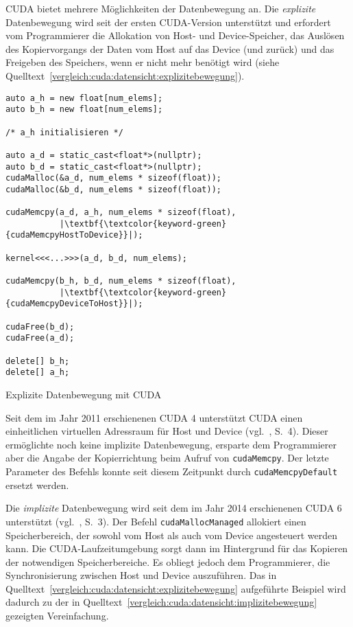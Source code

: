 CUDA bietet mehrere Möglichkeiten der Datenbewegung an. Die \textit{explizite}
Datenbewegung wird seit der ersten CUDA-Version unterstützt und erfordert vom
Programmierer die Allokation von Host- und Device-Speicher, das Auslösen des
Kopiervorgangs der Daten vom Host auf das Device (und zurück) und das Freigeben
des Speichers, wenn er nicht mehr benötigt wird (siehe
Quelltext~\ref{vergleich:cuda:datensicht:explizitebewegung}).

\begin{code}
    \begin{verbatim}
auto a_h = new float[num_elems];
auto b_h = new float[num_elems];

/* a_h initialisieren */

auto a_d = static_cast<float*>(nullptr);
auto b_d = static_cast<float*>(nullptr);
cudaMalloc(&a_d, num_elems * sizeof(float));
cudaMalloc(&b_d, num_elems * sizeof(float));

cudaMemcpy(a_d, a_h, num_elems * sizeof(float),
           |\textbf{\textcolor{keyword-green}{cudaMemcpyHostToDevice}}|);

kernel<<<...>>>(a_d, b_d, num_elems);

cudaMemcpy(b_h, b_d, num_elems * sizeof(float),
           |\textbf{\textcolor{keyword-green}{cudaMemcpyDeviceToHost}}|);

cudaFree(b_d);
cudaFree(a_d);

delete[] b_h;
delete[] a_h;
    \end{verbatim}
    \caption{Explizite Datenbewegung mit CUDA}
    \label{vergleich:cuda:datensicht:explizitebewegung}
\end{code}

Seit dem im Jahr 2011 erschienenen CUDA 4 unterstützt CUDA einen einheitlichen
virtuellen Adressraum für Host und Device (vgl.~\cite{cuda2011}, S.\ 4). Dieser
ermöglichte noch keine implizite Datenbewegung, ersparte dem Programmierer
aber die Angabe der Kopierrichtung beim Aufruf von
\texttt{cudaMemcpy}. Der letzte Parameter des Befehls konnte seit
diesem Zeitpunkt durch \texttt{cudaMemcpyDefault} ersetzt werden.

Die \textit{implizite} Datenbewegung wird seit dem im Jahr 2014 erschienenen
CUDA 6 unterstützt (vgl.~\cite{cuda2014}, S.\ 3). Der Befehl
\texttt{cudaMallocManaged} allokiert einen Speicherbereich, der sowohl
vom Host als auch vom Device angesteuert werden kann. Die CUDA-Laufzeitumgebung
sorgt dann im Hintergrund für das Kopieren der notwendigen Speicherbereiche. Es
obliegt jedoch dem Programmierer, die Synchronisierung zwischen Host und Device
auszuführen. Das in Quelltext~\ref{vergleich:cuda:datensicht:explizitebewegung}
aufgeführte Beispiel wird dadurch zu der in
Quelltext~\ref{vergleich:cuda:datensicht:implizitebewegung} gezeigten
Vereinfachung.

